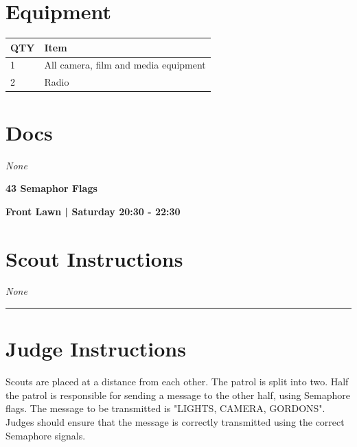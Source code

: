 \documentclass[10pt]{article}
\newcommand{\newtitle}[1]{\begin{center}{\Huge\bfseries #1 }\\ \vspace{5mm}\end{center}}
\newcommand{\newsubtitle}[1]{\begin{center}{\color{grey}\Large\bfseries #1 }\\ \vspace{5mm}\end{center}}
\begin{document}
	\begin{multicols}{2}

		\section*{\faWrench \: Equipment}

		
	\begin{center}
			\begin{tabular}{p{2cm}p{4cm}}


				\textbf{QTY} & \textbf{Item} \\\toprule
												1&All camera, film and media equipment\\\midrule
												2&Radio\\\midrule
								\end{tabular}

			\end{center}

		
		\vfill\null
		\columnbreak

			\section*{\faFile \: Docs}
		 	\textit{None}
	

		\vfill\null

		\end{multicols}



	\vspace{1cm}


	\clearpage
		\newtitle{43 Semaphor Flags }
	\newsubtitle{Front Lawn | Saturday 20:30 - 22:30}
		\setcounter{section}{42}
	\section*{Scout Instructions}
		\textit{None}
	
	\vspace{0.5cm}
	\hrule
	\vspace{0.5cm}

		\section*{Judge Instructions}
		Scouts are placed at a distance from each other. The patrol is split into two. Half the patrol is responsible for sending a message to the other half, using Semaphore flags. The message to be transmitted is "LIGHTS, CAMERA, GORDONS". Judges should ensure that the message is correctly transmitted using the correct Semaphore signals. 
\end{document}
